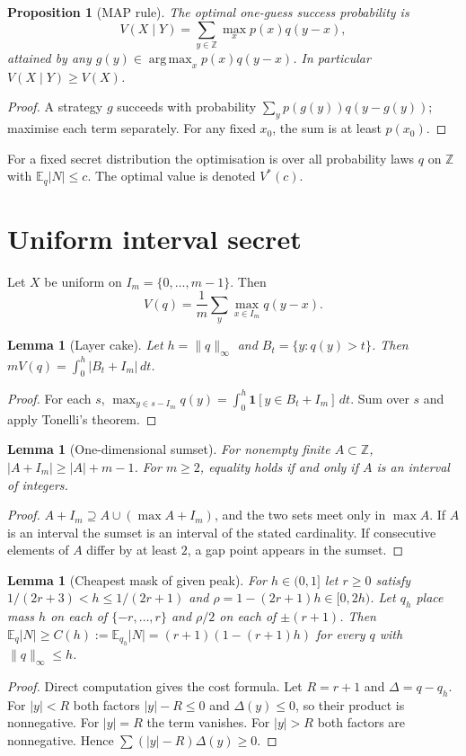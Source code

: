 \documentclass[conference]{IEEEtran}
\DeclareMathOperator*{\argmax}{arg\,max}
\newtheorem{proposition}[theorem]{Proposition}
\newtheorem{lemma}[theorem]{Lemma}
\newcommand{\Z}{\mathbb{Z}}
\newcommand{\E}{\mathbb{E}}
\begin{document}
\begin{proposition}[MAP rule]\label{prop:map}
The optimal one-guess success probability is
\[
V(X\mid Y)=\sum_{y\in\Z}\max_x p(x)q(y-x),
\]
attained by any \(g(y)\in\argmax_x p(x)q(y-x)\). In particular \(V(X\mid Y)\ge V(X)\).
\end{proposition}
\begin{proof}
A strategy \(g\) succeeds with probability \(\sum_y p(g(y))q(y-g(y))\); maximise each term separately. For any fixed \(x_0\), the sum is at least \(p(x_0)\).
\end{proof}

For a fixed secret distribution the optimisation is over all probability laws \(q\) on \(\Z\) with \(\E_q|N|\le c\). The optimal value is denoted \(V^*(c)\).

\section{Uniform interval secret}
Let \(X\) be uniform on \(I_m=\{0,\dots,m-1\}\). Then
\[
V(q)=\frac1m\sum_y\max_{x\in I_m}q(y-x).
\]

\begin{lemma}[Layer cake]\label{lem:layer}
Let \(h=\|q\|_\infty\) and \(B_t=\{y:q(y)>t\}\). Then \(mV(q)=\int_0^h|B_t+I_m|\,dt\).
\end{lemma}
\begin{proof}
For each \(s\), \(\max_{y\in s-I_m}q(y)=\int_0^h\mathbf 1[y\in B_t+I_m]\,dt\). Sum over \(s\) and apply Tonelli's theorem.
\end{proof}

\begin{lemma}[One-dimensional sumset]\label{lem:sumset}
For nonempty finite \(A\subset\Z\), \(|A+I_m|\ge|A|+m-1\). For \(m\ge2\), equality holds if and only if \(A\) is an interval of integers.
\end{lemma}
\begin{proof}
\(A+I_m\supseteq A\cup(\max A+I_m)\), and the two sets meet only in \(\max A\). If \(A\) is an interval the sumset is an interval of the stated cardinality. If consecutive elements of \(A\) differ by at least \(2\), a gap point appears in the sumset.
\end{proof}

\begin{lemma}[Cheapest mask of given peak]\label{lem:fill}
For \(h\in(0,1]\) let \(r\ge0\) satisfy \(1/(2r+3)<h\le1/(2r+1)\) and \(\rho=1-(2r+1)h\in[0,2h)\). Let \(q_h\) place mass \(h\) on each of \(\{-r,\dots,r\}\) and \(\rho/2\) on each of \(\pm(r+1)\). Then \(\E_q|N|\ge C(h):=\E_{q_h}|N|=(r+1)(1-(r+1)h)\) for every \(q\) with \(\|q\|_\infty\le h\).
\end{lemma}
\begin{proof}
Direct computation gives the cost formula. Let \(R=r+1\) and \(\Delta=q-q_h\). For \(|y|<R\) both factors \(|y|-R\le0\) and \(\Delta(y)\le0\), so their product is nonnegative. For \(|y|=R\) the term vanishes. For \(|y|>R\) both factors are nonnegative. Hence \(\sum(|y|-R)\Delta(y)\ge0\).
\end{proof}
\end{document}

